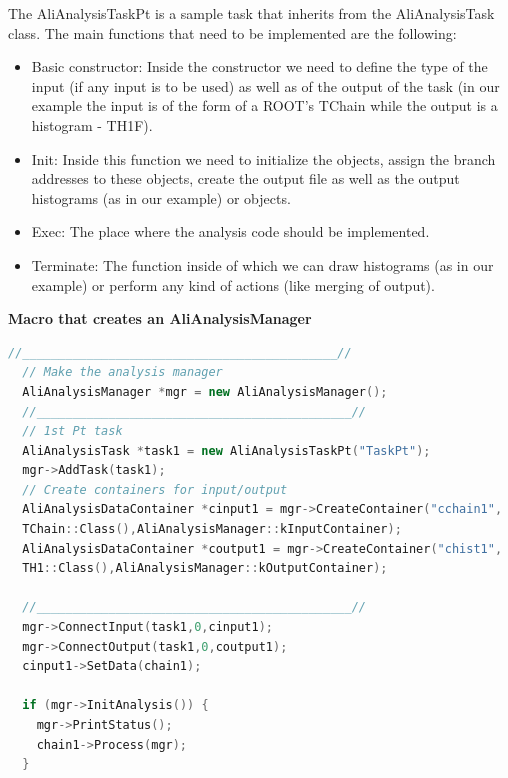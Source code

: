 The {\ttfamily AliAnalysisTaskPt} is a sample task that inherits from the {\ttfamily AliAnalysisTask} class. The main functions that need to be implemented are the following:

\begin{itemize}
\item Basic constructor: Inside the constructor we need to define the type of the input (if any input is to be used) as well as of the output of the task (in our example the input is of the form of a ROOT's {\ttfamily TChain} while the output is a histogram - {\ttfamily TH1F}).
\item {\ttfamily Init:} Inside this function we need to initialize the objects, assign the branch addresses to these objects, create the output file as well as the output histograms (as in our example) or objects.
\item {\ttfamily Exec:} The place where the analysis code should be implemented.
\item {\ttfamily Terminate:} The function inside of which we can draw histograms (as in our example) or perform any kind of actions (like merging of output).
\end{itemize}

\vspace{0.5 cm}
\textbf{Macro that creates an AliAnalysisManager}
\begin{lstlisting}[language=C++]
  //____________________________________________//
  // Make the analysis manager
  AliAnalysisManager *mgr = new AliAnalysisManager();
  //____________________________________________//
  // 1st Pt task
  AliAnalysisTask *task1 = new AliAnalysisTaskPt("TaskPt");
  mgr->AddTask(task1);
  // Create containers for input/output
  AliAnalysisDataContainer *cinput1 = mgr->CreateContainer("cchain1",
  TChain::Class(),AliAnalysisManager::kInputContainer);
  AliAnalysisDataContainer *coutput1 = mgr->CreateContainer("chist1", 
  TH1::Class(),AliAnalysisManager::kOutputContainer);
  
  //____________________________________________//
  mgr->ConnectInput(task1,0,cinput1);
  mgr->ConnectOutput(task1,0,coutput1);
  cinput1->SetData(chain1);
  
  if (mgr->InitAnalysis()) {
    mgr->PrintStatus();
    chain1->Process(mgr);
  }
\end{lstlisting}

